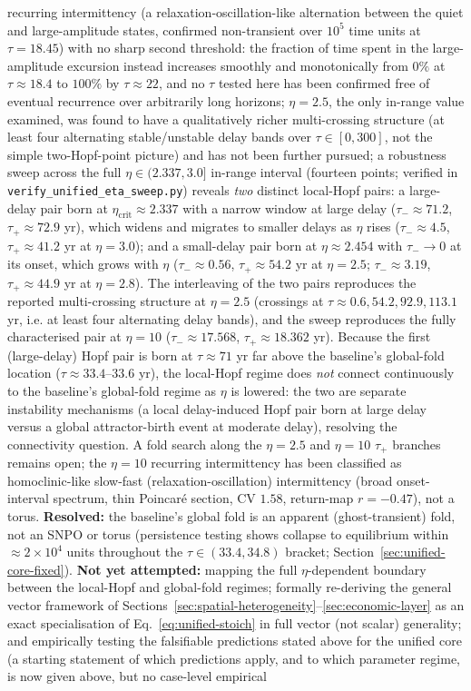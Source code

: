 \documentclass[twocolumn,10pt]{article}
\begin{document}
recurring intermittency (a relaxation-oscillation-like alternation between the quiet and large-amplitude states, confirmed non-transient over $10^5$ time units at $\tau=18.45$) with no sharp second threshold: the fraction of time spent in the large-amplitude excursion instead increases smoothly and monotonically from $0\%$ at $\tau\approx18.4$ to $100\%$ by $\tau\approx22$, and no $\tau$ tested here has been confirmed free of eventual recurrence over arbitrarily long horizons; $\eta=2.5$, the only in-range value examined, was found to have a qualitatively richer multi-crossing structure (at least four alternating stable/unstable delay bands over $\tau\in[0,300]$, not the simple two-Hopf-point picture) and has not been further pursued; a robustness sweep across the full $\eta\in(2.337,3.0]$ in-range interval (fourteen points; verified in \texttt{verify\_unified\_eta\_sweep.py}) reveals \emph{two} distinct local-Hopf pairs: a large-delay pair born at $\eta_{\text{crit}}\approx2.337$ with a narrow window at large delay ($\tau_-\approx71.2$, $\tau_+\approx72.9$ yr), which widens and migrates to smaller delays as $\eta$ rises ($\tau_-\approx4.5$, $\tau_+\approx41.2$ yr at $\eta=3.0$); and a small-delay pair born at $\eta\approx2.454$ with $\tau_-\to0$ at its onset, which grows with $\eta$ ($\tau_-\approx0.56$, $\tau_+\approx54.2$ yr at $\eta=2.5$; $\tau_-\approx3.19$, $\tau_+\approx44.9$ yr at $\eta=2.8$). The interleaving of the two pairs reproduces the reported multi-crossing structure at $\eta=2.5$ (crossings at $\tau\approx0.6,54.2,92.9,113.1$ yr, i.e. at least four alternating delay bands), and the sweep reproduces the fully characterised pair at $\eta=10$ ($\tau_-\approx17.568$, $\tau_+\approx18.362$ yr). Because the first (large-delay) Hopf pair is born at $\tau\approx71$ yr far above the baseline's global-fold location ($\tau\approx33.4$--$33.6$ yr), the local-Hopf regime does \emph{not} connect continuously to the baseline's global-fold regime as $\eta$ is lowered: the two are separate instability mechanisms (a local delay-induced Hopf pair born at large delay versus a global attractor-birth event at moderate delay), resolving the connectivity question. A fold search along the $\eta=2.5$ and $\eta=10$ $\tau_+$ branches remains open; the $\eta=10$ recurring intermittency has been classified as homoclinic-like slow-fast (relaxation-oscillation) intermittency (broad onset-interval spectrum, thin Poincar\'e section, CV $1.58$, return-map $r=-0.47$), not a torus. \textbf{Resolved:} the baseline's global fold is an apparent (ghost-transient) fold, not an SNPO or torus (persistence testing shows collapse to equilibrium within $\approx2\times10^4$ units throughout the $\tau\in(33.4,34.8)$ bracket; Section~\ref{sec:unified-core-fixed}). \textbf{Not yet attempted:} mapping the full $\eta$-dependent boundary between the local-Hopf and global-fold regimes; formally re-deriving the general vector framework of Sections~\ref{sec:spatial-heterogeneity}--\ref{sec:economic-layer} as an exact specialisation of Eq.~\eqref{eq:unified-stoich} in full vector (not scalar) generality; and empirically testing the falsifiable predictions stated above for the unified core (a starting statement of which predictions apply, and to which parameter regime, is now given above, but no case-level empirical 
\end{document}
